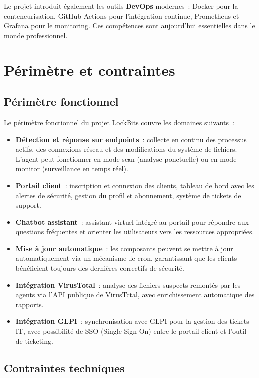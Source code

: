 Le projet introduit également les outils \textbf{DevOps} modernes~:
Docker pour la conteneurisation, GitHub Actions pour l'intégration
continue, Prometheus et Grafana pour le monitoring. Ces compétences sont
aujourd'hui essentielles dans le monde professionnel.

\section{Périmètre et contraintes}

\subsection{Périmètre fonctionnel}

Le périmètre fonctionnel du projet LockBits couvre les domaines
suivants~:

\begin{itemize}
  \item \textbf{Détection et réponse sur endpoints}~: collecte en
    continu des processus actifs, des connexions réseau et des
    modifications du système de fichiers. L'agent peut fonctionner en
    mode scan (analyse ponctuelle) ou en mode monitor (surveillance en
    temps réel).
  \item \textbf{Portail client}~: inscription et connexion des clients,
    tableau de bord avec les alertes de sécurité, gestion du profil et
    abonnement, système de tickets de support.
  \item \textbf{Chatbot assistant}~: assistant virtuel intégré au portail
    pour répondre aux questions fréquentes et orienter les utilisateurs
    vers les ressources appropriées.
  \item \textbf{Mise à jour automatique}~: les composants peuvent se
    mettre à jour automatiquement via un mécanisme de cron, garantissant
    que les clients bénéficient toujours des dernières correctifs de
    sécurité.
  \item \textbf{Intégration VirusTotal}~: analyse des fichiers suspects
    remontés par les agents via l'API publique de VirusTotal, avec
    enrichissement automatique des rapports.
  \item \textbf{Intégration GLPI}~: synchronisation avec GLPI pour la
    gestion des tickets IT, avec possibilité de SSO (Single Sign-On)
    entre le portail client et l'outil de ticketing.
\end{itemize}

\subsection{Contraintes techniques}

